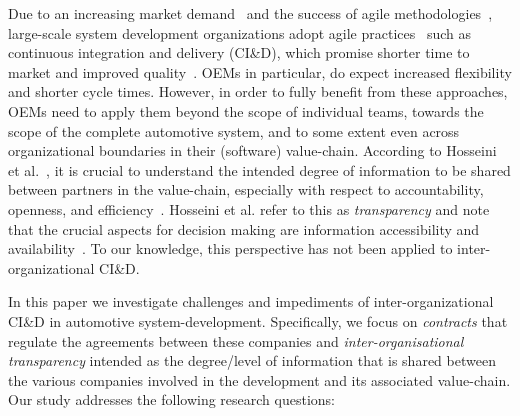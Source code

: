 Due to an increasing market demand~\cite{olsson2012climbing} and the success of agile methodologies~\cite{laanti2011agile}, large-scale system development organizations adopt agile practices~\cite{jalali2010agile} such as continuous integration and delivery (CI\&D), which promise shorter time to market and improved quality~\cite{olsson2012climbing}.
OEMs in particular, do expect increased flexibility and shorter cycle times.
However, in order to fully benefit from these approaches, OEMs need to apply them %
beyond the scope of individual teams, towards the scope of the complete automotive system,  %
and to some extent even across organizational boundaries in their (software) value-chain. %
According to Hosseini et al.~\cite{Hosseini2016}, it is crucial to understand the intended degree of information to be shared between partners in the value-chain, especially with respect to accountability, openness, and efficiency~\cite{Ball2009}.
Hosseini et al. refer to this as \emph{transparency} and note that the crucial aspects for decision making are information accessibility and availability~\cite{Hosseini2016,Turilli2009}.
To our knowledge, this  perspective has not been applied to inter-organizational CI\&D. %

In this paper we investigate %
challenges and impediments of inter-organizational CI\&D in automotive system-development. 
Specifically, we focus on {\em contracts} that regulate the agreements between these companies 
and {\em {inter-organisational} transparency} intended as the degree/level of information that is shared between the various companies %
involved in the development and its associated value-chain. %
Our study %
addresses the following research questions:

